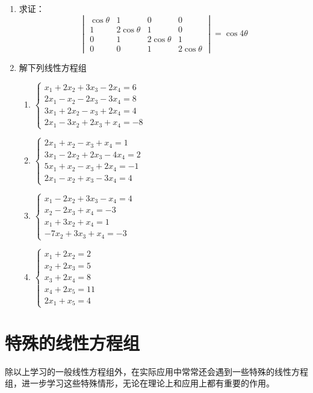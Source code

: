 \begin{enumerate}
\item 求证：
\[\begin{vmatrix}
\cos\theta & 1&0&0\\
1&2\cos\theta&1&0\\
0&1&2\cos\theta&1\\
0&0&1&2\cos\theta    
\end{vmatrix}=\cos4\theta\]

\item 解下列线性方程组
\begin{multicols}{2}
    \begin{enumerate}
    \item $\begin{cases}
 x_1+2x_2+3x_3-2x_4=6\\
 2x_1-x_2-2x_3-3x_4=8\\
 3x_1+2x_2-x_3+2x_4=4\\
 2x_1-3x_2+2x_3+x_4=-8       
    \end{cases}$
    \item $\begin{cases}
2x_1+x_2-x_3+x_4=1\\
3x_1-2x_2+2x_3-4x_4=2\\
5x_1+x_2-x_3+2x_4=-1\\
2x_1-x_2+x_3-3x_4=4        
    \end{cases}$
    \item $\begin{cases}
 x_1-2x_2+3x_3-x_4=4\\
 x_2-2x_3+x_4=-3\\
 x_1+3x_2+x_4=1\\
 -7x_2+3x_3+x_4=-3       
    \end{cases}$
    \item $\begin{cases}
x_1+2x_2=2\\
x_2+2x_3=5\\
x_3+2x_4=8\\
x_4+2x_5=11\\
2x_1+x_5=4    
    \end{cases}$
\end{enumerate}
\end{multicols}

\end{enumerate}

\section{特殊的线性方程组}
除以上学习的一般线性方程组外，在实际应用中常常还会遇到一些特殊的线性方程组，进一步学习这些特殊情形，无论在理论上和应用上都有重要的作用。

